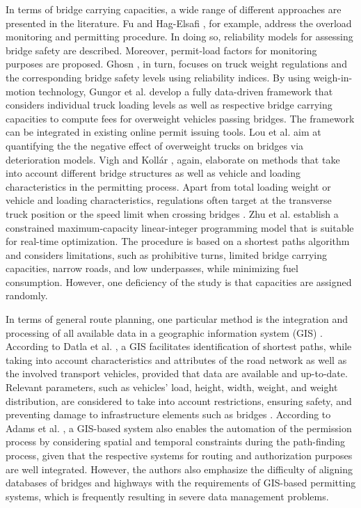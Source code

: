 \par
In terms of bridge carrying capacities, a wide range of different approaches are presented in the literature. Fu and Hag-Elsafi \cite{fu2000vehicular}, for example, address the overload monitoring and permitting procedure. In doing so, reliability models for assessing bridge safety are described. Moreover, permit-load factors for monitoring purposes are proposed. Ghosn \cite{ghosn2000development}, in turn, focuses on truck weight regulations and the corresponding bridge safety levels using reliability indices. By using weigh-in-motion technology, Gungor et al. \cite{gungor2018detect} develop a fully data-driven framework that considers individual truck loading levels as well as respective bridge carrying capacities to compute fees for overweight vehicles passing bridges. The framework can be integrated in existing online permit issuing tools. Lou et al. \cite{lou2016effect} aim at quantifying the the negative effect of overweight trucks on bridges via deterioration models. Vigh and Kollár \cite{vigh2006approximate, vigh2007routing}, again, elaborate on methods that take into account different bridge structures as well as vehicle and loading characteristics in the permitting process. Apart from total loading weight or vehicle and loading characteristics, regulations often target at the transverse truck position or the speed limit when crossing bridges \cite{yan2018optimal}. Zhu et al. \cite{zhu2014vehicle} establish a constrained maximum-capacity linear-integer programming model that is suitable for real-time optimization. The procedure is based on a shortest paths algorithm and considers limitations, such as prohibitive turns, limited bridge carrying capacities, narrow roads, and low underpasses, while minimizing fuel consumption. However, one deficiency of the study is that capacities are assigned randomly.
\par
In terms of general route planning, one particular method is the integration and processing of all available data in a geographic information system (GIS) \cite{Osegueda.1999, durham2002gis, dayan2014methodology, li2012mapping}.
According to Datla et al. \cite{datla2004gis}, a GIS facilitates identification of shortest paths, while taking into account characteristics and attributes of the road network as well as the involved transport vehicles, provided that data are available and up-to-date. Relevant parameters, such as vehicles' load, height, width, weight, and weight distribution, are considered to take into account restrictions, ensuring safety, and preventing damage to infrastructure elements such as bridges \cite{ecmt2006improving, vaitkus2016effect, kombe2017modelling, pauer2017development}. According to Adams et al. \cite{adams2002enterprise}, a GIS-based system also enables the automation of the permission process by considering spatial and temporal constraints during the path-finding process, given that the respective systems for routing and authorization purposes are well integrated. However, the authors also emphasize the difficulty of aligning databases of bridges and highways with the requirements of GIS-based permitting systems, which is frequently resulting in severe data management problems.
